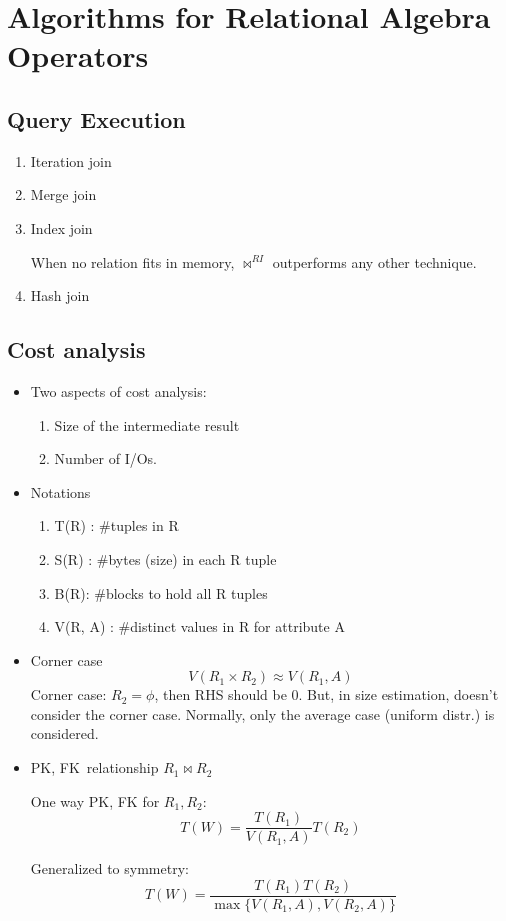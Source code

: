 \documentclass[a4paper]{report}
\begin{document}
\section{Algorithms for Relational Algebra Operators}
\subsection{Query Execution}
\begin{enumerate}
\item Iteration join
\item Merge join 
\item Index join 

When no relation fits in memory, $\bowtie^{RI}$ outperforms any other technique. 
\item Hash join 
\end{enumerate}
\subsection{Cost analysis}
\begin{itemize}
\item Two aspects of cost analysis:
\begin{enumerate}
\item Size of the intermediate result 
\item Number of I/Os.
\end{enumerate}
\item Notations
\begin{enumerate}
\item T(R) : #tuples in R
\item S(R) : #bytes (size) in each R tuple
\item B(R): #blocks to hold all R tuples 
\item V(R, A) : #distinct values in R for attribute A
\end{enumerate}
\item Corner case 
$$
V(R_1\times R_2) \approx V(R_1, A)
$$
Corner case: $R_2=\phi$, then RHS should be 0. But, in size estimation, doesn't consider the corner case. Normally, only the average case (uniform distr.) is considered. 
\end{itemize}
\begin{itemize}
\item \textbraceleft PK, FK\textbraceright\ relationship $R_1\bowtie R_2$

One way PK, FK for $R_1, R_2$: 
$$
T(W) = \frac{T(R_1)}{V(R_1, A)} T(R_2)
$$

Generalized to symmetry: 
$$
T(W) = \frac{T(R_1)T(R_2)}{\max\{V(R_1, A), V(R_2, A)\}}
$$
\end{itemize}
\end{document}

